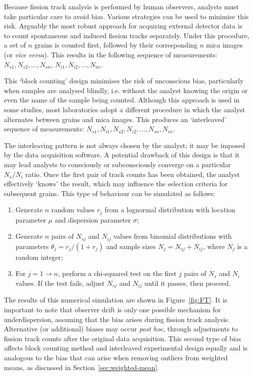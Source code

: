 \documentclass[gchron, manuscript]{copernicus}
\begin{document}
Because fission track analysis is performed by human observers,
analysts must take particular care to avoid bias. Various strategies
can be used to minimise this risk. Arguably the most robust approach
for acquiring external detector data is to count spontaneous and
induced fission tracks separately. Under this procedure, a set of $n$
grains is counted first, followed by their corresponding $n$ mica
images (or \emph{vice versa}). This results in the following sequence
of measurements: $N_{s1}, N_{s2}, \ldots, N_{sn}$, $N_{i1}, N_{i2},
\ldots, N_{in}$.\medskip

This `block counting' design minimises the risk of unconscious bias,
particularly when samples are analysed blindly, i.e. without the
analyst knowing the origin or even the name of the sample being
counted. Although this approach is used in some studies, most
laboratories adopt a different procedure in which the analyst
alternates between grains and mica images. This produces an
`interleaved' sequence of measurements: $N_{s1}, N_{i1}, N_{s2},
N_{i2}, \ldots, N_{sn}, N_{in}$.\medskip

The interleaving pattern is not always chosen by the analyst; it may
be imposed by the data acquisition software. A potential drawback of
this design is that it may lead analysts to consciously or
subconsciously converge on a particular $N_s/N_i$ ratio. Once the
first pair of track counts has been obtained, the analyst effectively
`knows' the result, which may influence the selection criteria for
subsequent grains. This type of behaviour can be simulated as follows:

\begin{enumerate}
\item Generate $n$ random values $r_j$ from a lognormal distribution
  with location parameter $\mu$ and dispersion parameter $\sigma$;
\item Generate $n$ pairs of $N_{sj}$ and $N_{ij}$ values from binomial
  distributions with parameters $\theta_j = r_j/(1+r_j)$ and sample
  sizes $N_j = N_{sj} + N_{ij}$, where $N_j$ is a random integer;
\item For $j=1\rightarrow{n}$, perform a chi-squared test on the first
  $j$ pairs of $N_s$ and $N_i$ values. If the test fails, adjust
  $N_{sj}$ and $N_{ij}$ until it passes, then proceed.
\end{enumerate}

The results of this numerical simulation are shown in
Figure~\ref{fig:FT}. It is important to note that observer drift is
only one possible mechanism for underdispersion, assuming that the
bias arises during fission track analysis. Alternative (or additional)
biases may occur \emph{post hoc}, through adjustments to fission track
counts after the original data acquisition. This second type of bias
affects block counting method and interleaved experimental design
equally and is analogous to the bias that can arise when removing
outliers from weighted means, as discussed in
Section~\ref{sec:weighted-mean}.
\end{document}
